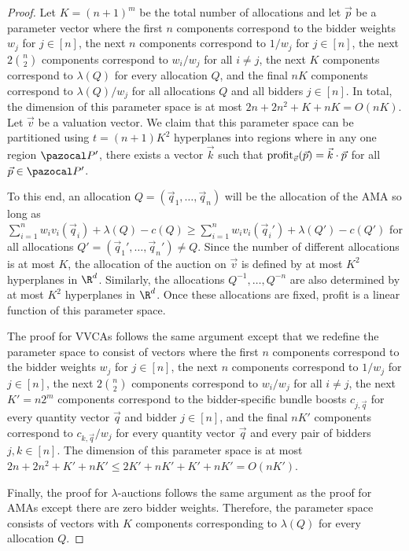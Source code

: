 \AMA*

\begin{proof}
Let $K = (n+1)^m$ be the total number of allocations and let $\vec{p}$ be a parameter vector where the first $n$ components correspond to the bidder weights $w_j$ for $j \in [n]$, the next $n$ components correspond to $1/w_j$ for $j \in [n]$, the next $2{n \choose 2}$ components correspond to $w_i/w_j$ for all $i \not= j$, the next $K$ components correspond to $\lambda(Q)$ for every allocation $Q$, and the final $nK$ components correspond to $\lambda(Q)/w_j$ for all allocations $Q$ and all bidders $j \in [n]$. In total, the dimension of this parameter space is at most $2n + 2n^2 + K + nK = O(nK)$. Let $\vec{v}$ be a valuation vector. We claim that this parameter space can be partitioned using $t = (n+1)K^2$ hyperplanes into regions where in any one region $\pspace'$, there exists a vector $\vec{k}$ such that $\textnormal{profit}_{\vec{v}}(\vec{p}) = \vec{k} \cdot \vec{p}$ for all $\vec{p} \in\pspace'$.

To this end, an allocation $Q = \left(\vec{q}_1, \dots, \vec{q}_n\right)$ will be the allocation of the AMA so long as $\sum_{i = 1}^n w_i v_i\left(\vec{q}_i\right) + \lambda(Q) - c(Q) \geq \sum_{i = 1}^n w_i v_i\left(\vec{q}_i'\right) + \lambda\left(Q'\right) - c(Q')$ for all allocations $Q' = \left(\vec{q}_1', \dots, \vec{q}_n'\right) \not= Q$. Since the number of different allocations is at most $K$, the allocation of the auction on $\vec{v}$ is defined by at most $K^2$ hyperplanes in $\R^{d}$. Similarly, the allocations $Q^{-1}, \dots, Q^{-n}$ are also determined by at most $K^2$ hyperplanes in $\R^{d}$.
Once these allocations are fixed, profit is a linear function of this parameter space.

The proof for VVCAs follows the same argument except that we redefine the parameter space to consist of vectors where the first $n$ components correspond to the bidder weights $w_j$ for $j \in [n]$, the next $n$ components correspond to $1/w_j$ for $j \in [n]$, the next $2{n \choose 2}$ components correspond to $w_i/w_j$ for all $i \not= j$, the next $K' = n2^m$ components correspond to the bidder-specific bundle boosts $c_{j,\vec{q}}$ for every quantity vector $\vec{q}$ and bidder $j \in [n]$, and the final $nK'$ components correspond to $c_{k,\vec{q}}/w_j$ for every quantity vector $\vec{q}$ and every pair of bidders $j,k \in [n]$. The dimension of this parameter space is at most $2n + 2n^2 + K' + nK' \leq 2K' + nK' + K' + nK' = O(nK')$.

Finally, the proof for $\lambda$-auctions follows the same argument as the proof for AMAs except there are zero bidder weights. Therefore, the parameter space consists of vectors with $K$ components corresponding to $\lambda(Q)$ for every allocation $Q$.
\end{proof} 

